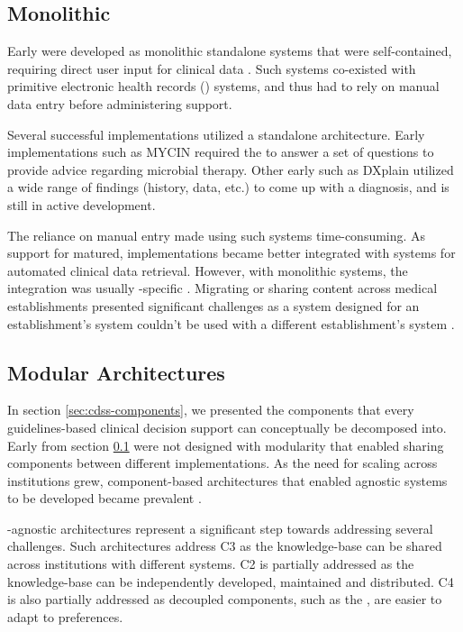 \subsection{Monolithic \CDSSs{}}\label{sec:monolithic-cdss}

Early \CDSSs{} were developed as monolithic standalone systems
that were self-contained, requiring direct user input for clinical data
\cite{RodriguezBook16}. Such systems co-existed with
primitive electronic health records (\EHR{}) systems,
and thus had to rely on manual data entry before administering support.

Several successful \CDSSs{} implementations utilized a standalone
architecture. Early \CDSS{} implementations
such as MYCIN \cite{ShortliffeBook12} required the \HCP{}
to answer a set of questions to provide advice regarding microbial therapy.
Other early \CDSSs{} such as DXplain \cite{BarnettJAMA87} utilized a wide
range of findings (history, data, etc.) to come up with a diagnosis, and
is still in active development.

The reliance on manual entry made using such systems time-consuming. As support for \EHR{} matured,
\CDSSs{} implementations became better integrated with \EHR{} systems
for automated clinical data retrieval.
However, with monolithic systems, the integration was usually \EHR{}-specific \cite{RodriguezBook16}.
Migrating or sharing \CDSS{} content across medical establishments
presented significant challenges as a system designed
for an establishment's \EHR{} system couldn't be used with a different
establishment's \EHR{} system \cite{KawamotoJBI10}.

\subsection{Modular \CDSS{} Architectures}\label{sec:modular-architectures}

In section \ref{sec:cdss-components}, we presented the components that
every guidelines-based clinical decision support can conceptually be decomposed
into. Early \CDSSs{} from section \ref{sec:monolithic-cdss}
were not designed with modularity that enabled sharing components
between different implementations. As the need for scaling \CDSSs{}
across institutions grew, component-based architectures that
enabled \EHR{} agnostic systems to be developed became prevalent \cite{KawamotoJBI10}.

\EHR{}-agnostic architectures represent a significant step towards
addressing several challenges. Such architectures
address C3 as the knowledge-base can be shared across institutions with
different \EHR{} systems. C2 is partially addressed as the
knowledge-base can be independently developed, maintained and distributed.
C4 is also partially addressed as decoupled components, such as the \UI{},
are easier to adapt to \HCP{} preferences.

